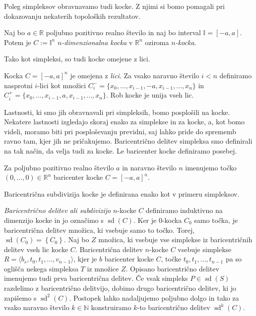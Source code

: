 \documentclass[mat1]{fmfdelo}
\newcommand{\R}{\mathbb R}
\newcommand{\N}{\mathbb N}
\DeclareMathOperator{\sd}{sd}
\newcommand{\I}{\mathbb I}
\newcommand{\0}{\underline{0}}
\begin{document}
Poleg simpleksov obravnavamo tudi kocke. Z njimi si bomo pomagali pri dokazovanju nekaterih topoloških rezultatov. 
\begin{definicija}
Naj bo $a \in \R$ poljubno pozitivno realno število in naj bo interval $\I = \left [ -a, a \right ] $. Potem je $C := \I^n$ \emph{$n$-dimenzionalna kocka} v $\R^n$ oziroma \emph{$n$-kocka}. 
\end{definicija}
Tako kot simpleksi, so tudi kocke omejene z lici.
\begin{definicija}
Kocka $C = [-a, a]^n$ je omejena z \emph{lici}. Za vsako naravno število $i < n$ definiramo nasprotni $i$-lici kot množici
$C_i^- = \{x_0, \dots, x_{i - 1}, -a, x_{i - 1}, \dots, x_n\}$ in  $C_i^+ = \{x_0, \dots, x_{i - 1}, a, x_{i - 1}, \dots, x_n\}$. Rob  kocke je unija vseh lic.
\end{definicija}
Lastnosti, ki smo jih obravnavali pri simpleksih, bomo posplošili na kocke. Nekatere lastnosti izgledajo skoraj enako za simplekse in za kocke, a, kot bomo videli, moramo biti pri posploševanju previdni, saj lahko pride do sprememb ravno tam, kjer jih ne pričakujemo.
Baricentrično delitev simpleksa smo definirali na tak način, da velja tudi za kocke. Le baricenter kocke definiramo posebej.
\begin{definicija}
Za poljubno pozitivno realno število $a$ in naravno število $n$ imenujemo točko $(0, \dots, 0) \in \R^n$ baricenter kocke $C = \left [ -a, a \right ]^n$.
\end{definicija}
Baricentrična subdivizija kocke je definirana enako kot v primeru simpleksov.
\begin{definicija}
\emph{Baricentrično delitev ali subdivizijo} $n$-kocke $C$ definiramo induktivno na dimenzijo kocke in jo označimo s $\sd(C)$. Ker je $0$-kocka $C_0$ samo točka, je baricentrična delitev množica, ki vsebuje samo to točko. Torej, $\sd(C_0) = \left \{ C_0 \right \}$. Naj bo $Z$ množica, ki vsebuje vse simplekse iz baricentričnih delitev vseh lic kocke $C$.
Baricentrična delitev $n$-kocke $C$ vsebuje simplekse $R = \langle b_s , t_0, t_1, \dots, v_{n-1} \rangle$, kjer je $b$ baricenter kocke $C$, točke $t_0, t_1, \dots, t_{n-1}$ pa so oglišča nekega simpleksa $T$ iz množice $Z$. Opisano baricentrično delitev imenujemo tudi prva baricentrična delitev. Če vsak simpleks $P \in \sd(S)$ razdelimo z baricentrično delitvijo, dobimo drugo baricentrično delitev, ki jo zapišemo s $\sd^2(C)$. Postopek lahko nadaljujemo poljubno dolgo in tako za vsako naravno število $k \in \N$ konstruiramo $k$-to baricentrično delitev $\sd^k(C)$.
\end{definicija}
\end{document}
